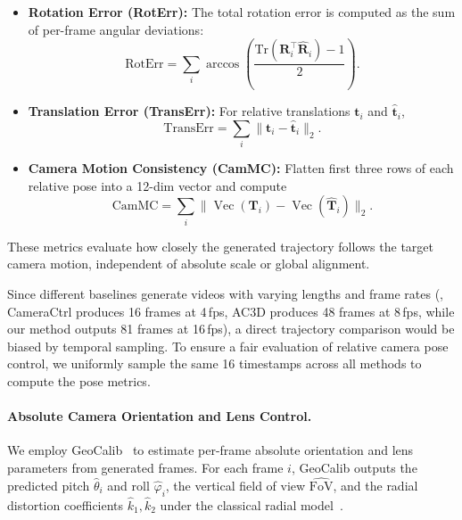 \begin{itemize}

    \item \textbf{Rotation Error (RotErr):}
    The total rotation error is computed as the sum of per-frame angular
    deviations:
    \begin{equation}
    \mathrm{RotErr}
    =
    \sum_i
    \arccos\!\left(
        \frac{
            \mathrm{Tr}\!\left(
                \mathbf{R}_i^{\top}\hat{\mathbf{R}}_i
            \right)-1
        }{2}
    \right).
    \end{equation}

    \item \textbf{Translation Error (TransErr):}
    For relative translations \(\mathbf{t}_i\) and \(\hat{\mathbf{t}}_i\),
    \begin{equation}
    \mathrm{TransErr}
    =
    \sum_i
    \big\|
        \mathbf{t}_i - \hat{\mathbf{t}}_i
    \big\|_2 .
    \end{equation}

    \item \textbf{Camera Motion Consistency (CamMC):}
    Flatten first three rows of each relative pose into a 12-dim vector and compute
    \begin{equation}
    \mathrm{CamMC}
    =
    \sum_i
    \big\|
        \operatorname{Vec}(\mathbf{T}_i)
        -
        \operatorname{Vec}(\hat{\mathbf{T}}_i)
    \big\|_2 .
    \end{equation}

\end{itemize}

These metrics evaluate how closely the generated trajectory follows the target camera motion, independent of absolute scale or global alignment.

Since different baselines generate videos with varying lengths and frame rates (\eg, CameraCtrl produces 16 frames at 4\,fps, AC3D produces 48 frames at 8\,fps, while our method outputs 81 frames at 16\,fps), a direct trajectory comparison would be biased by temporal sampling.  
To ensure a fair evaluation of relative camera pose control, we uniformly sample the same 16 timestamps across all methods to compute the pose metrics.

\paragraph{Absolute Camera Orientation and Lens Control.}

We employ GeoCalib~\cite{veicht2024geocalib} to estimate per-frame absolute orientation and lens parameters from generated frames.
For each frame \(i\), GeoCalib outputs the predicted pitch \(\hat{\theta}_i\) and roll \(\hat{\varphi}_i\), the vertical field of view \(\widehat{\mathrm{FoV}}\), and the radial distortion coefficients \(\hat{k}_1, \hat{k}_2\) under the classical radial model~\cite{Brown1966DecenteringDO}.  

